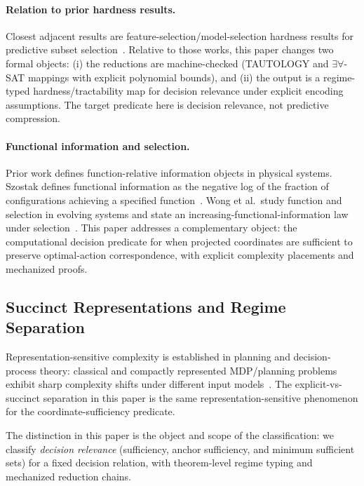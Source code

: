 \paragraph{Relation to prior hardness results.}
Closest adjacent results are feature-selection/model-selection hardness results for predictive subset selection~\cite{blum1997selection, amaldi1998complexity}. Relative to those works, this paper changes two formal objects: (i) the reductions are machine-checked (TAUTOLOGY and $\exists\forall$-SAT mappings with explicit polynomial bounds), and (ii) the output is a regime-typed hardness/tractability map for decision relevance under explicit encoding assumptions. The target predicate here is decision relevance, not predictive compression.

\paragraph{Functional information and selection.}
Prior work defines function-relative information objects in physical systems. Szostak defines functional information as the negative log of the fraction of configurations achieving a specified function~\cite{szostak2003functional}. Wong et al.\ study function and selection in evolving systems and state an increasing-functional-information law under selection~\cite{wong2023roles}. This paper addresses a complementary object: the computational decision predicate for when projected coordinates are sufficient to preserve optimal-action correspondence, with explicit complexity placements and mechanized proofs.

\subsection{Succinct Representations and Regime Separation}

Representation-sensitive complexity is established in planning and decision-process theory: classical and compactly represented MDP/planning problems exhibit sharp complexity shifts under different input models~\cite{papadimitriou1987mdp,mundhenk2000mdp,littman1998probplanning}. The explicit-vs-succinct separation in this paper is the same representation-sensitive phenomenon for the coordinate-sufficiency predicate.

The distinction in this paper is the object and scope of the classification: we classify \emph{decision relevance} (sufficiency, anchor sufficiency, and minimum sufficient sets) for a fixed decision relation, with theorem-level regime typing and mechanized reduction chains.


